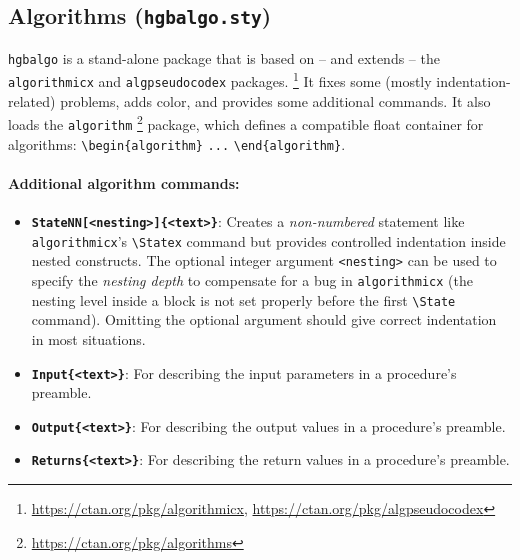 \documentclass[english]{hgbarticle}
\begin{document}
\subsection{Algorithms (\texttt{hgbalgo.sty})}

\texttt{hgbalgo} is a stand-alone package that is based on -- and extends --
the \texttt{algorithmicx} and \texttt{algpseudocodex} packages.%
\footnote{\url{https://ctan.org/pkg/algorithmicx},
    \url{https://ctan.org/pkg/algpseudocodex}}
It fixes some (mostly indentation-related) problems, adds color, and provides
some additional commands. It also loads the \texttt{algorithm}%
\footnote{\url{https://ctan.org/pkg/algorithms}}
package, which defines a compatible float container for algorithms:
\verb!\begin{algorithm}! \verb!...! \verb!\end{algorithm}!.

\paragraph{Additional algorithm commands:}
\begin{itemize}
    \item
    \textbf{\texttt{{\bs}StateNN[<nesting>]\{<text>\}}}:
    Creates a \emph{non-numbered} statement like \texttt{algo\-rith\-micx}'s
    \verb!\Statex! command but provides controlled indentation inside nested
    constructs. The optional integer argument \verb!<nesting>! can be used to
    specify the \emph{nesting depth} to compensate for a bug in
    \texttt{algorithmicx} (the nesting level inside a block is not set
    properly before the first \verb!\State! command). Omitting the optional
    argument should give correct indentation in most situations.
    \item
    \textbf{\texttt{{\bs}Input\{<text>\}}}:
    For describing the input parameters in a procedure's preamble.
    \item
    \textbf{\texttt{{\bs}Output\{<text>\}}}:
    For describing the output values in a procedure's preamble.
    \item
    \textbf{\texttt{{\bs}Returns\{<text>\}}}:
    For describing the return values in a procedure's preamble.
\end{itemize}
\end{document}
